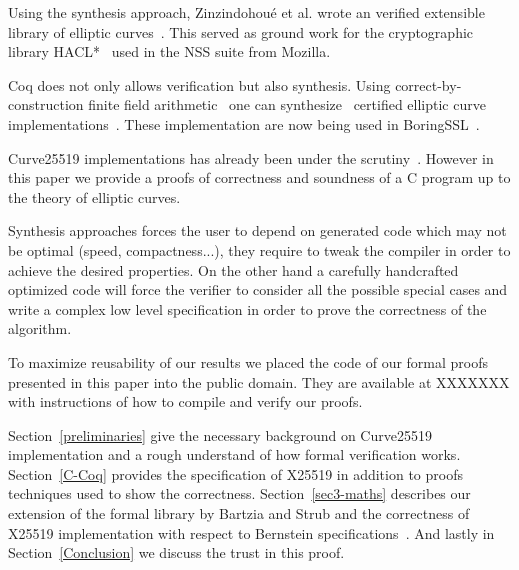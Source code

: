 Using the synthesis approach, Zinzindohou{\'{e}} et al. wrote an verified extensible
library of elliptic curves~\cite{Zinzindohoue2016AVE}. This served as ground work for the
cryptographic library HACL*~\cite{zinzindohoue2017hacl} used in the NSS suite from Mozilla.

Coq does not only allows verification but also synthesis.
Using correct-by-construction finite field arithmetic~\cite{Philipoom2018CorrectbyconstructionFF}
one can synthesize~\cite{Erbsen2016SystematicSO} certified elliptic curve
implementations~\cite{Erbsen2017CraftingCE}. These implementation are now being used in BoringSSL~\cite{fiat-crypto}.

Curve25519 implementations has already been under the scrutiny~\cite{Chen2014VerifyingCS}.
However in this paper we provide a proofs of correctness and soundness of a C program up to
the theory of elliptic curves.

Synthesis approaches forces the user to depend on generated code which may not
be optimal (speed, compactness...), they require to tweak the compiler in order
to achieve the desired properties. On the other hand a carefully handcrafted
optimized code will force the verifier to consider all the possible special cases
and write a complex low level specification in order to prove the correctness of
the algorithm.

To maximize reusability of our results we placed the code of our formal proofs
presented in this paper into the public domain. They are available at XXXXXXX
with instructions of how to compile and verify our proofs.

Section~\ref{preliminaries} give the necessary background on Curve25519
implementation and a rough understand of how formal verification works.
Section~\ref{C-Coq} provides the specification of X25519 in addition to proofs
techniques used to show the correctness.
Section~\ref{sec3-maths} describes our extension of the formal library by Bartzia
and Strub and the correctness of X25519 implementation with respect to Bernstein
specifications~\cite{Ber14}.
And lastly in Section~\ref{Conclusion} we discuss the trust in this proof.



